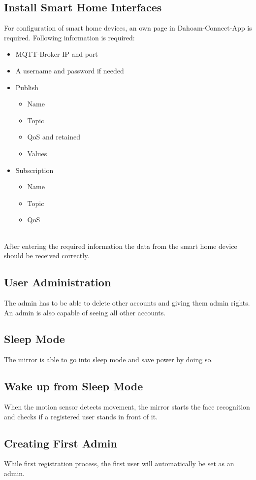 \documentclass[12pt]{article}
\theoremstyle{definition}
\begin{document}
\subsection{Install Smart Home Interfaces}
For configuration of smart home devices, an own page in Dahoam-Connect-App is required. Following information is required:
\begin{itemize}
    \item MQTT-Broker IP and port
    \item A username and password if needed
    \item Publish
    \begin{itemize}
        \item Name
        \item Topic
        \item QoS and retained
        \item Values
    \end{itemize}
    \item Subscription
    \begin{itemize}
        \item Name
        \item Topic
        \item QoS
    \end{itemize}
\end{itemize}
\\
After entering the required information the data from the smart home device should be received correctly.
\subsection{User Administration}
The admin has to be able to delete other accounts and giving them admin rights. An admin is also capable of seeing all other accounts.
\subsection{Sleep Mode}
The mirror is able to go into sleep mode and save power by doing so.
\subsection{Wake up from Sleep Mode}
When the motion sensor detects movement, the mirror starts the face recognition and checks if a registered user stands in front of it. 
\subsection{Creating First Admin}
While first registration process, the first user will automatically be set as an admin.
\end{document}
